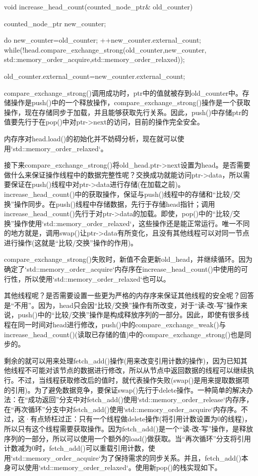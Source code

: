 \begin{cpp}
void increase_head_count(counted_node_ptr& old_counter)
{
  counted_node_ptr new_counter;

  do
  {
    new_counter=old_counter;
    ++new_counter.external_count;
  }
  while(!head.compare_exchange_strong(old_counter,new_counter,
        std::memory_order_acquire,std::memory_order_relaxed));

  old_counter.external_count=new_counter.external_count;
}
\end{cpp}

compare\_exchange\_strong()调用成功时，ptr中的值就被存到old\_counter中。存储操作是push()中的一个释放操作，compare\_exchange\_strong()操作是一个获取操作，现在存储同步于加载，并且能够获取先行关系。因此，push()中存储ptr的值要先行于在pop()中对ptr->next的访问，目前的操作完全安全。

内存序对head.load()的初始化并不妨碍分析，现在就可以使用`std::memory\_order\_relaxed`。

接下来compare\_exchange\_strong()将old\_head.ptr->next设置为head。是否需要做什么来保证操作线程中的数据完整性呢？交换成功就能访问ptr->data，所以需要保证在push()线程中对ptr->data进行存储(在加载之前)。increase\_head\_count()中的获取操作，保证与push()线程中的存储和“比较/交换”操作同步。在push()线程中存储数据，先行于存储head指针；调用increase\_head\_count()先行于对ptr->data的加载。即使，pop()中的“比较/交换”操作使用`std::memory\_order\_relaxed`，这些操作还是能正常运行。唯一不同的地方就是，调用swap()让ptr->data有所变化，且没有其他线程可以对同一节点进行操作(这就是“比较/交换”操作的作用)。

compare\_exchange\_strong()失败时，新值不会更新old\_head，并继续循环。因为确定了`std::memory\_order\_acquire`内存序在increase\_head\_count()中使用的可行性，所以使用`std::memory\_order\_relaxed`也可以。

其他线程呢？是否需要设置一些更为严格的内存序来保证其他线程的安全呢？回答是“不用”。因为，head只会因“比较/交换”操作有所改变，对于“读-改-写”操作来说，push()中的“比较/交换”操作是构成释放序列的一部分。因此，即使有很多线程在同一时间对head进行修改，push()中的compare\_exchange\_weak()与increase\_head\_count()(读取已存储的值)中的compare\_exchange\_strong()也是同步的。

剩余的就可以用来处理fetch\_add()操作(用来改变引用计数的操作)，因为已知其他线程不可能对该节点的数据进行修改，所以从节点中返回数据的线程可以继续执行。不过，当线程获取修改后的值时，就代表操作失败(swap()是用来提取数据项的引用)。为了避免数据竞争，要保证swap()先行于delete操作。一种简单的解决办法：在“成功返回”分支中对fetch\_add()使用`std::memory\_order\_release`内存序，在“再次循环”分支中对fetch\_add()使用`std::memory\_order\_acquire`内存序。不过，这·有点矫枉过正：只有一个线程做delete操作(将引用计数设置为0的线程)，所以只有这个线程需要获取操作。因为fetch\_add()是一个“读-改-写”操作，是释放序列的一部分，所以可以使用一个额外的load()做获取。当“再次循环”分支将引用计数减为0时，fetch\_add()可以重载引用计数，使用`std::memory\_order\_acquire`为了保持需求的同步关系。并且，fetch\_add()本身可以使用`std::memory\_order\_relaxed`。使用新pop()的栈实现如下。

